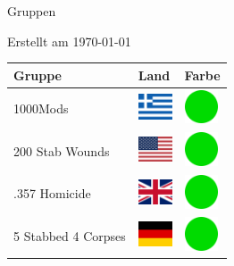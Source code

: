\documentclass[12pt, a4paper, twoside]{report}
\begin{document}
	
	\begin{center}
		\vspace{1cm}
		{\Large Gruppen\par}
		
		{\large Erstellt am \today\par}
	\end{center}
	
	\begin{center}
		\begin{longtable}{|p{5cm}|p{2cm}|p{2cm}|} 
			
			\hline
			\rowcolor{lightgray} Gruppe & Land & Farbe \\ \hline
			\endhead
 1000Mods                                                   & \includegraphics[width=1cm]{../4x3/gr} &   \includegraphics[width=1cm]{../likes/y} \\ \hline
 200 Stab Wounds                                            & \includegraphics[width=1cm]{../4x3/us} &   \includegraphics[width=1cm]{../likes/y} \\ \hline
 .357 Homicide                                              & \includegraphics[width=1cm]{../4x3/gb} &   \includegraphics[width=1cm]{../likes/y} \\ \hline
 5 Stabbed 4 Corpses                                        & \includegraphics[width=1cm]{../4x3/de} &   \includegraphics[width=1cm]{../likes/y} \\ \hline

\end{longtable}
\end{center}
\end{document}
